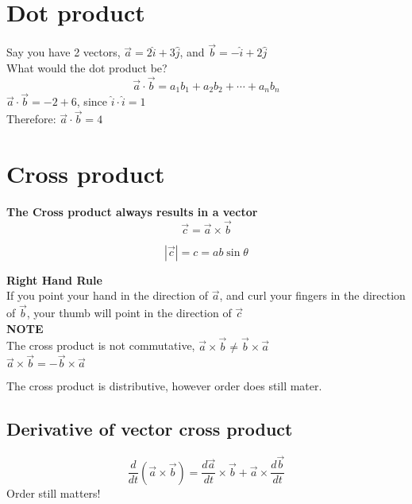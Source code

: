\documentclass[]{article}
\date{}
\title{\docTitle}
\author{\docAuthor}
\date{January 27\textsuperscript{th}, 2023}
\begin{document}
\maketitle
\section*{Dot product}
Say you have 2 vectors, $\vec{a}=2\hat{i}+3\hat{j}$, and $\vec{b}=-\hat{i}+2\hat{j}$\\
What would the dot product be?\\
\begin{equation*}
\vec{a}\cdot\vec{b} = a_1b_1 + a_2b_2 + \cdots + a_nb_n
\end{equation*}
$\vec{a}\cdot\vec{b} = -2+6$, since $\hat{i} \cdot \hat{i} = 1$\\
Therefore: $\vec{a}\cdot\vec{b} = 4$\\


\section{Cross product}
\textbf{The Cross product always results in a vector}
\begin{equation*}
    \vec{c} = \vec{a}\times\vec{b}
\end{equation*}

\begin{equation*}
    |\vec{c}| = c = ab\sin\theta
\end{equation*}

\textbf{Right Hand Rule}\\
If you point your hand in the direction of $\vec{a}$, and curl your fingers in the direction of $\vec{b}$, your thumb will point in the direction of $\vec{c}$\\
    
\textbf{NOTE}\\
The cross product is not commutative, $\vec{a}\times\vec{b} \neq \vec{b}\times\vec{a}$\\
$\vec{a}\times\vec{b}=-\vec{b}\times\vec{a}$

The cross product is distributive, however order does still mater.

\subsection*{Derivative of vector cross product}
\begin{equation*}
    \frac{d}{dt}(\vec{a}\times\vec{b}) = \frac{d\vec{a}}{dt}\times\vec{b} + \vec{a}\times\frac{d\vec{b}}{dt}
\end{equation*}
Order still matters!\\
\end{document}

